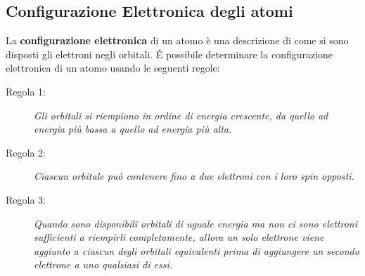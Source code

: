 \subsection{Configurazione Elettronica degli atomi}
La \textbf{configurazione elettronica} di un atomo è una descrizione di come si sono disposti gli elettroni negli orbitali. É possibile determinare la configurazione elettronica di un atomo usando le seguenti regole:
\begin{description}
	\item[Regola 1:] \textit{Gli orbitali si riempiono in ordine di energia crescente, da quello ad energia più bassa a quello ad energia più alta.}
	\item[Regola 2:] \textit{Ciascun orbitale può contenere fino a due elettroni con i loro spin opposti.}
	\item[Regola 3:] \textit{Quando sono disponibili orbitali di uguale energia ma non ci sono elettroni sufficienti a riempirli completamente, allora un solo elettrone viene aggiunto a ciascun degli orbitali equivalenti prima di aggiungere un secondo elettrone a uno qualsiasi di essi.}
\end{description}
